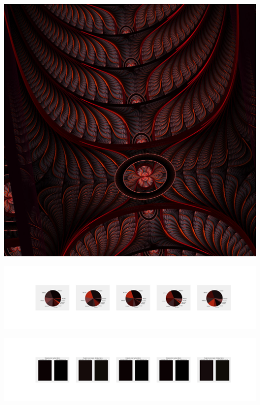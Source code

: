 \documentclass[11pt]{article}
\begin{document}
\begin{landscape}
    \begin{center}
    \includegraphics[width=\textwidth]{./nbimg/file (27).jpg}
    \end{center}

    \begin{center}
    \includegraphics[width=250mm]{./nbimg/pie-189.jpg}
    \end{center}

    \begin{center}
    \includegraphics[width=250mm]{./nbimg/peak-189.jpg}
    \end{center}
    


\end{landscape}
\end{document}

